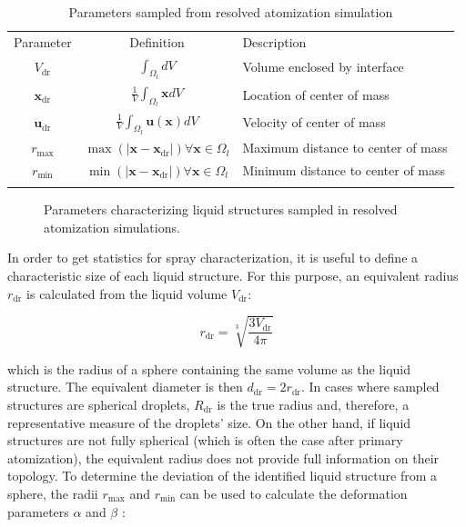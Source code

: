 \begin{table}[!h]
\centering
\caption{Parameters sampled from resolved atomization simulation}
\begin{tabular}{ccl}
\thickhline
Parameter & Definition & Description \\
\thickhline
$V_\mathrm{dr}$ & $\displaystyle \int_{\Omega_l} d V$ & Volume enclosed by interface  \\
\hline
$\textbf{x}_\mathrm{dr}$ & $\displaystyle \frac{1}{V} \int_{\Omega_l} \boldsymbol{x} d V$ &   Location of center of mass \\
\hline
$\textbf{u}_\mathrm{dr}$ & $\displaystyle \frac{1}{V} \int_{\Omega_l} \textbf{u} \left( \boldsymbol{x} \right) d V$ & Velocity of center of mass  \\
\hline
$r_\mathrm{max}$ & $\displaystyle \max \left( | \textbf{x} - \textbf{x}_\mathrm{dr} | \right) \forall \textbf{x} \in \Omega_l$ & Maximum distance to center of mass \\
\hline
$r_\mathrm{min}$ & $\displaystyle \min \left( | \textbf{x} - \textbf{x}_\mathrm{dr} |  \right) \forall \textbf{x} \in \Omega_l$ & Minimum distance to center of mass \\
\thickhline
\end{tabular}
\label{tab:sampling_parameters}
\end{table}

\begin{figure}[h!]	
	\centering
	\caption{Parameters characterizing liquid structures sampled in resolved atomization simulations. }
	\label{fig:droplet_sampling_parameters}
\end{figure}

In order to get statistics for spray characterization, it is useful to define a characteristic size of each liquid structure. For this purpose, an equivalent radius $r_\mathrm{dr}$ is calculated from the liquid volume $V_\mathrm{dr}$:

\begin{equation}
\label{eq:ch4_r_equivalent_calculation}
r_\mathrm{dr} = \sqrt[3]{\frac{3 V_\mathrm{dr}}{4 \pi}}
\end{equation}

which is the radius of a sphere containing the same volume as the liquid structure. The equivalent diameter is then $d_\mathrm{dr} = 2 r_\mathrm{dr}$. In cases where sampled structures are spherical droplets, $R_\mathrm{dr}$ is the true radius and, therefore, a representative measure of the droplets' size. On the other hand, if liquid structures are not fully spherical (which is often the case after primary atomization), the equivalent radius does not provide full information on their topology. To determine the deviation of the identified liquid structure from a sphere, the radii $r_\mathrm{max}$ and $r_\mathrm{min}$ can be used to calculate the deformation parameters $\alpha$ and $\beta$ :


